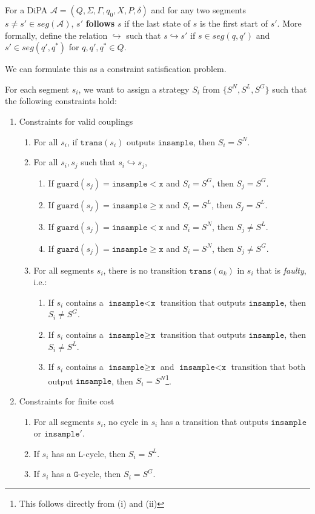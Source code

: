 \documentclass[12pt]{article}
\newcommand{\gguard}[1][x]{\texttt{insample}\geq \texttt{#1}}
\newcommand{\lguard}[1][x]{\texttt{insample} < \texttt{#1}}
\newcommand{\guard}{\texttt{guard}}
\newcommand{\trans}{\texttt{trans}}
\theoremstyle{definition}
\begin{document}
\begin{defn}
	For a DiPA $\mathcal{A} = (Q, \Sigma, \Gamma, q_0, X, P, \delta)$ and for any two segments $s\neq s'\in seg(\mathcal{A})$, $s'$ \textbf{follows} $s$ if the last state of $s$ is the first start of $s'$. More formally, define the relation $\hookrightarrow$ such that $s \hookrightarrow s'$ if $s \in seg(q, q')$ and $s'\in seg(q', q^*)$ for $q, q', q^* \in Q$. 
\end{defn}


We can formulate this as a constraint satisfication problem.

For each segment $s_i$, we want to assign a strategy $S_i$ from $\{S^N, S^L, S^G\}$ such that the following constraints hold:
\begin{enumerate}
	\item Constraints for valid couplings\begin{enumerate}
		\item For all $s_i$, if $\trans(s_i)$ outputs $\texttt{insample}$, then $S_i = S^N$.
		\item For all $s_i, s_j$ such that $s_i\hookrightarrow s_j$, \begin{enumerate}
			\item If $\guard(s_j)=\lguard$ and $S_i = S^G$, then $S_j = S^G$. 
			\item If $\guard(s_j) = \gguard$ and $S_i = S^L$, then $S_j = S^L$.
			\item If $\guard(s_j) = \lguard$ and $S_i = S^N$, then $S_j\neq S^L$.
			\item If $\guard(s_j) = \gguard$ and $S_i = S^N$, then $S_j\neq S^G$.
		\end{enumerate}
		\item For all segments $s_i$, there is no transition $\trans(a_k)$ in $s_i$ that is \textit{faulty}, i.e.:\begin{enumerate}
			\item If $s_i$ contains a $\lguard$ transition that outputs $\texttt{insample}$, then $S_i \neq S^G$.
			\item If $s_i$ contains a $\gguard$ transition that outputs $\texttt{insample}$, then $S_i \neq S^L$.
			\item If $s_i$ contains a $\gguard$ and $\lguard$ transition that both output $\texttt{insample}$, then $S_i = S^N$\footnote{This follows directly from (i) and (ii)}.
		\end{enumerate}
	\end{enumerate}
	\item Constraints for finite cost\begin{enumerate}
		\item For all segments $s_i$, no cycle in $s_i$ has a transition that outputs $\texttt{insample}$ or $\texttt{insample}'$. 
		\item If $s_i$ has an $\texttt{L}$-cycle, then $S_i = S^L$.
		\item If $s_i$ has a $\texttt{G}$-cycle, then $S_i = S^G$. 
	\end{enumerate}
\end{enumerate}
\end{document}

